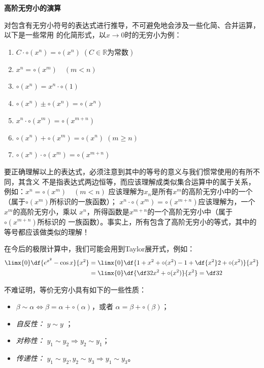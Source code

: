 \begin{shaded}
	{\bf 高阶无穷小的演算}
	
	对包含有无穷小符号的表达式进行推导，不可避免地会涉及一些化简、合并运算，以下是一些常用
	的化简形式，以$x\to 0$时的无穷小为例：
	\begin{enumerate}[(1)]
  	  \setlength{\itemindent}{1cm}
  	  \item $C\cdot\circ(x^n)=\circ(x^n)\;(C\in\mathbb{R}\mbox{为常数})$
	  \item $x^n=\circ(x^m)\quad (m<n)$ 
	  \item $\circ(x^n)=x^n\cdot\circ(1)$
	  \item $\circ(x^n)\pm\circ(x^n)=\circ(x^n)$
	  \item $x^n\cdot\circ(x^m)=\circ(x^{m+n})$ 
	  \item $\circ(x^n)+\circ(x^m)=\circ(x^n)\;(m\geq n)$  
	  \item $\circ(x^n)\cdot\circ(x^m)=\circ(x^{m+n})$
	\end{enumerate}
	
	要正确理解以上的表达式，必须注意到其中的等号的意义与我们惯常使用的有所不同，其含义
	不是指表达式两边恒等，而应该理解成类似集合运算中的属于关系，例如：$x^n=\circ(x^m)\quad (m<n)$ 
	应该理解为$x_n$是所有$x^m$的高阶无穷小中的一个（属于$\circ(x^m)$所标识的一族函数）；
	$x^n\cdot\circ(x^m)=\circ(x^{m+n})$应该理解为，一个$x^m$的高阶无穷小，乘以
	$x^n$，所得函数是$x^{m+n}$的一个高阶无穷小中（属于$\circ(x^{m+n})$所标识的
	一族函数）。事实上，所有包含了高阶无穷小的等式，其中的等号都应该做类似的理解！
	
	在今后的极限计算中，我们可能会用到Taylor展开式，例如：
	\begin{align}
		\limx{0}\df{e^{x^2}-\cos x}{x^2}&=\limx{0}
		\df{1+x^2+\circ(x^2)-1+\df{x^2}2+\circ(x^2)}{x^2}\notag\\
		&=\limx{0}\df{\df32x^2+\circ(x^2)}{x^2}=\df32\notag
	\end{align}
\end{shaded}


不难证明，等价无穷小具有如下的一些性质：
\begin{itemize}
  \setlength{\itemindent}{1cm}
  \item $\beta\sim\alpha\Leftrightarrow\beta=\alpha+\circ(\alpha)$，或者
	$\alpha=\beta+\circ(\beta)$；
  \item {\it 自反性：} $y\sim y$ ；
  \item {\it 对称性：} $y_1\sim y_2\Rightarrow y_2\sim y_1$； 
  \item {\it 传递性：} $y_1\sim y_2,y_2\sim y_3\Rightarrow y_1\sim y_3$。 
\end{itemize}

